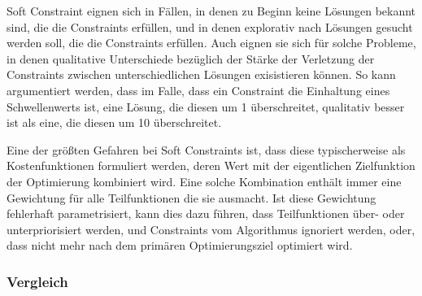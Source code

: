 Soft Constraint eignen sich in Fällen, in denen zu Beginn keine Lösungen bekannt sind, die die Constraints erfüllen, und in denen explorativ nach Lösungen gesucht werden soll, die die Constraints erfüllen.
Auch eignen sie sich für solche Probleme, in denen qualitative Unterschiede bezüglich der Stärke der Verletzung der Constraints zwischen unterschiedlichen Lösungen exisistieren können.
So kann argumentiert werden, dass im Falle, dass ein Constraint die Einhaltung eines Schwellenwerts ist, eine Lösung, die diesen um 1 überschreitet, qualitativ besser ist als eine, die diesen um 10 überschreitet.

Eine der größten Gefahren bei Soft Constraints ist, dass diese typischerweise als Kostenfunktionen formuliert werden, deren Wert mit der eigentlichen Zielfunktion der Optimierung kombiniert wird.
Eine solche Kombination enthält immer eine Gewichtung für alle Teilfunktionen die sie ausmacht.
Ist diese Gewichtung fehlerhaft parametrisiert, kann dies dazu führen, dass Teilfunktionen über- oder unterpriorisiert werden, und Constraints vom Algorithmus ignoriert werden, oder, dass nicht mehr nach dem primären Optimierungsziel optimiert wird.

\subsubsection{Vergleich}


